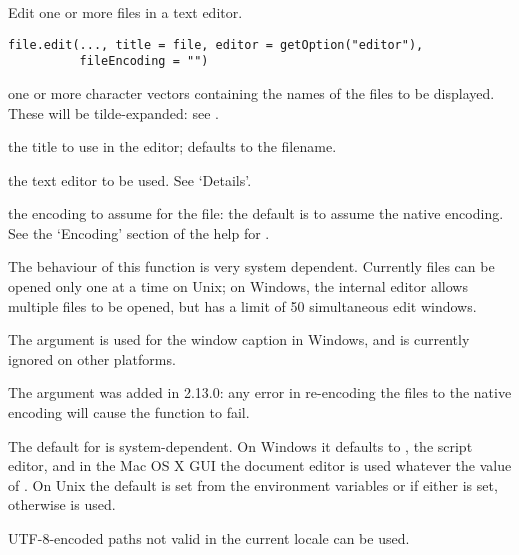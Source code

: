 %
\begin{Description}\relax
Edit one or more files in a text editor.
\end{Description}
%
\begin{Usage}
\begin{verbatim}
file.edit(..., title = file, editor = getOption("editor"),
          fileEncoding = "")
\end{verbatim}
\end{Usage}
%
\begin{Arguments}
\begin{ldescription}
\item[\code{...}] one or more character vectors containing the names of the
files to be displayed.  These will be tilde-expanded: see
.
\item[\code{title}] the title to use in the editor; defaults to the filename. 
\item[\code{editor}] the text editor to be used.  See `Details'.
\item[\code{fileEncoding}] the encoding to assume for the file: the default
is to assume the native encoding.  See the `Encoding' section
of the help for .
\end{ldescription}
\end{Arguments}
%
\begin{Details}\relax
The behaviour of this function is very system dependent.  Currently
files can be opened only one at a time on Unix; on Windows, the
internal editor allows multiple files to be opened, but has a limit of
50 simultaneous edit windows.

The  argument is used for the window caption in Windows,
and is currently ignored on other platforms.

The  argument was added in \R{} 2.13.0: any error in
re-encoding the files to the native encoding will cause the function
to fail.

The default for  is system-dependent.   On
Windows it defaults to , the script editor, and in
the Mac OS X GUI the document editor is used whatever the value of
.  On Unix the default is set from the environment
variables  or  if either is set, otherwise
 is used.

UTF-8-encoded paths not valid in the current locale can be used.  
\end{Details}
